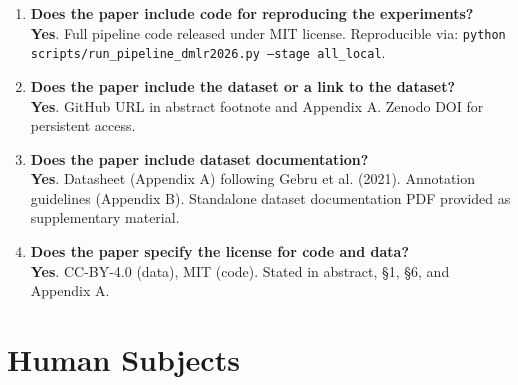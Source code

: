 \documentclass[11pt]{article}
\newcommand{\yes}{\textcolor{green!60!black}{\textbf{Yes}}}
\begin{document}
\begin{enumerate}[leftmargin=*]
    \item \textbf{Does the paper include code for reproducing the experiments?} \\
    \yes. Full pipeline code released under MIT license. Reproducible via: \texttt{python scripts/run\_pipeline\_dmlr2026.py --stage all\_local}.

    \item \textbf{Does the paper include the dataset or a link to the dataset?} \\
    \yes. GitHub URL in abstract footnote and Appendix A. Zenodo DOI for persistent access.

    \item \textbf{Does the paper include dataset documentation?} \\
    \yes. Datasheet (Appendix A) following Gebru et al. (2021). Annotation guidelines (Appendix B). Standalone dataset documentation PDF provided as supplementary material.

    \item \textbf{Does the paper specify the license for code and data?} \\
    \yes. CC-BY-4.0 (data), MIT (code). Stated in abstract, \S1, \S6, and Appendix A.
\end{enumerate}

\section{Human Subjects}
\end{document}

